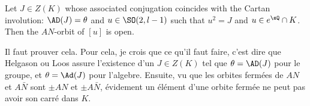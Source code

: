 \begin{proposition}
	Let $J\in Z(K)$ whose associated conjugation coincides with the Cartan involution: $\AD(J)=\theta$ and $u\in\SO(2,l-1)$ such that $u^2=J$ and $u\in e^{\sQ}\cap K$. Then the $AN$-orbit of $[u]$ is open.
\end{proposition}

\begin{probleme}
	Il faut prouver cela. Pour cela, je crois que ce qu'il faut faire, c'est dire que Helgason ou Loos assure l'existence d'un $J\in Z(K)$ tel que $\theta=\AD(J)$ pour le groupe, et $\theta=\Ad(J)$ pour l'algebre. Ensuite, vu que les orbites fermées de $AN$ et $A\bar N$ sont $\pm AN$ et $\pm A\bar N$, évidement un élément d'une orbite fermée ne peut pas avoir son carré dans $K$.
	\label{ProbAdJthetaj}
\end{probleme}


